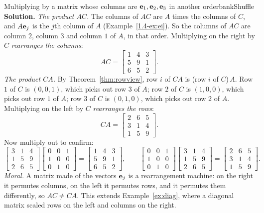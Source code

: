 \documentclass[11pt]{article}
\begin{document}
\begin{exmp}{Multiplying by a matrix whose columns are $\mathbf{e}_1,\mathbf{e}_2,\mathbf{e}_3$ in another order}{bankShuffle}
\textbf{Solution.} \emph{The product $AC$.} The columns of $AC$ are $A$ times the columns of $C$, and $A\mathbf{e}_j$ is the $j$th column of $A$ (Example~\ref{1.4-ex:ei}). So the columns of $AC$ are column $2$, column $3$ and column $1$ of $A$, in that order. Multiplying on the right by $C$ \emph{rearranges the columns}:
\[
AC=\begin{bmatrix}1&4&3\\5&9&1\\6&5&2\end{bmatrix}.
\]
\emph{The product $CA$.} By Theorem~\ref{thm:rowview}, row $i$ of $CA$ is (row $i$ of $C$)$\,A$. Row $1$ of $C$ is $(0,0,1)$, which picks out row $3$ of $A$; row $2$ of $C$ is $(1,0,0)$, which picks out row $1$ of $A$; row $3$ of $C$ is $(0,1,0)$, which picks out row $2$ of $A$. Multiplying on the left by $C$ \emph{rearranges the rows}:
\[
CA=\begin{bmatrix}2&6&5\\3&1&4\\1&5&9\end{bmatrix}.
\]
Now multiply out to confirm:
\[
\begin{bmatrix}3&1&4\\1&5&9\\2&6&5\end{bmatrix}\begin{bmatrix}0&0&1\\1&0&0\\0&1&0\end{bmatrix}=\begin{bmatrix}1&4&3\\5&9&1\\6&5&2\end{bmatrix},\qquad
\begin{bmatrix}0&0&1\\1&0&0\\0&1&0\end{bmatrix}\begin{bmatrix}3&1&4\\1&5&9\\2&6&5\end{bmatrix}=\begin{bmatrix}2&6&5\\3&1&4\\1&5&9\end{bmatrix}.
\]
\emph{Moral.} A matrix made of the vectors $\mathbf{e}_j$ is a rearrangement machine: on the right it permutes columns, on the left it permutes rows, and it permutes them differently, so $AC\neq CA$. This extends Example~\ref{ex:diag}, where a diagonal matrix scaled rows on the left and columns on the right.
\end{exmp}
\end{document}

